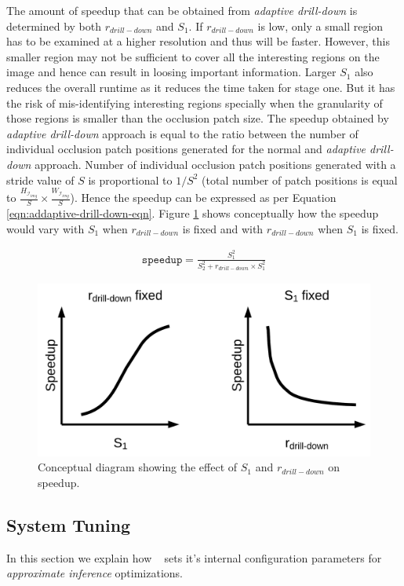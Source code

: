 The amount of speedup that can be obtained from \textit{adaptive drill-down} is determined by both $r_{drill-down}$ and $S_1$.
If $r_{drill-down}$ is low, only a small region has to be examined at a higher resolution and thus will be faster.
However, this smaller region may not be sufficient to cover all the interesting regions on the image and hence can result in loosing important information.
Larger $S_1$ also reduces the overall runtime as it reduces the time taken for stage one. But it has the risk of mis-identifying interesting regions specially when the granularity of those regions is smaller than the occlusion patch size.
The speedup obtained by \textit{adaptive drill-down} approach is equal to the ratio between the number of individual occlusion patch positions generated for the normal and \textit{adaptive drill-down} approach.
Number of individual occlusion patch positions generated with a stride value of $S$ is proportional to $1/S^2$ (total number of patch positions is equal to $\frac{H_{\mathcal{I}_{img}}}{S} \times \frac{W_{\mathcal{I}_{img}}}{S}$).
Hence the speedup can  be expressed as per Equation \ref{eqn:addaptive-drill-down-eqn}.
Figure \ref{fig:r_and_s1} shows conceptually how the speedup would vary with $S_1$ when $r_{drill-down}$ is fixed and with $r_{drill-down}$ when $S_1$ is fixed.

\begin{align}
\label{eqn:addaptive-drill-down-eqn}
\texttt{speedup} = \frac{S^2_1}{S^2_2+r_{drill-down} \times S^2_1}
\end{align}

\begin{figure}[t]
\includegraphics[width=0.7\columnwidth]{images/r_and_s1}
\caption{Conceptual diagram showing the effect of $S_1$ and $r_{drill-down}$ on speedup.}
\label{fig:r_and_s1}
\end{figure}

\subsection{System Tuning}
In this section we explain how \system~ sets it's internal configuration parameters for \textit{approximate inference} optimizations.

